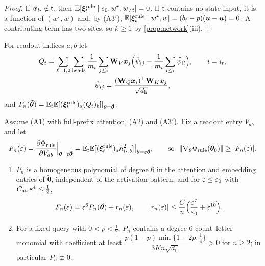 \begin{proof}
If $\bm x_{l_t}\notin\mathsf t$, then $\mathbb E[\bm\xi^{\mathrm{rule}}_t\mid s_0,w^\star,w_{\ne t}]=0$. If $\mathsf t$ contains no state input, it is a function of $(w^\star,w)$ and, by (A3$'$),
$\mathbb E[\bm\xi^{\mathrm{rule}}_t\mid w^\star,w]=(b_t-p)(\bm u-\bm u)=0$. A contributing term has two sites, so $k\ge1$ by \cref{prop:network}(iii).
\end{proof}

For readout indices $a,b$ let
\begin{gather*}
 Q_t=\sum_{\ell=1,2}\sum_{\mathrm{heads}}\frac{1}{m_i}\sum_{j\le i}\mathbf W_V\bm x_j\Bigl(\hat\psi_{ij}-\frac{1}{m_i}\sum_{l\le i}\hat\psi_{il}\Bigr),\qquad i=i_t,\\
 \hat\psi_{ij}=\frac{(\mathbf W_Q\bm x_i)^\top\mathbf W_K\bm x_j}{\sqrt{d_{\mathrm h}}},
\end{gather*}
and $P_n(\tilde{\bm\theta})=\mathbb E_t\mathbb E[(\bm\xi^{\mathrm{rule}}_t)_a(Q_t)_b]|_{\bm\theta=\tilde{\bm\theta}}$.

\begin{lemma}
\label{lem:leading}
Assume (A1) with full-prefix attention, (A2) and (A3$'$). Fix a readout entry $V_{ab}$ and let
\[
 F_n(\initscale)=\pd{\rulecredit}{V_{ab}}\Big|_{\bm\theta=\initscale\tilde{\bm\theta}}=\E_t\E[(\bm\xi^{\mathrm{rule}}_t)_ah^2_{i_t,b}]\big|_{\bm\theta=\initscale\tilde{\bm\theta}},\qquad\text{so }\ \|\nabla_{\bm\theta}\rulecredit(\bm\theta_0)\|\ge|F_n(\initscale)|.
\]
\begin{enumerate}[label=(\roman*),leftmargin=*,itemsep=0pt,topsep=2pt]
\item $P_n$ is a homogeneous polynomial of degree $6$ in the attention and embedding entries of $\tilde{\bm\theta}$, independent of the activation
pattern, and for $\varepsilon\le\varepsilon_0$ with $C_{\mathrm{att}}\varepsilon^4\le\frac{1}{2}$,
\[
 F_n(\varepsilon)=\varepsilon^6P_n(\tilde{\bm\theta})+r_n(\varepsilon),\qquad |r_n(\varepsilon)|\le\frac{C}{n}\Bigl(\frac{\varepsilon^7}{\varepsilon_0}+\varepsilon^{10}\Bigr).
\]
\item For a fixed query with $0<p<\frac{1}{2}$, $P_n$ contains a degree-$6$ count--letter monomial with coefficient at least
$\dfrac{p(1-p)\min\{1-2p,\frac{1}{4}\}}{3Kn\sqrt{d_{\mathrm h}}}>0$ for $n\ge2$; in particular $P_n\not\equiv0$.
\end{enumerate}
\end{lemma}

